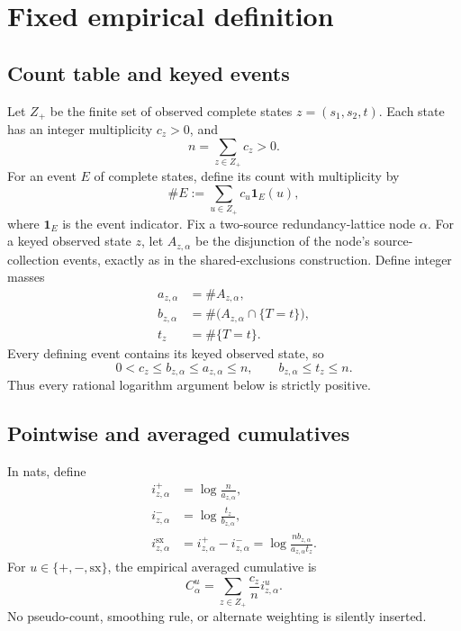 \documentclass[11pt]{article}
\theoremstyle{definition}
\newcommand{\sx}{\mathrm{sx}}
\begin{document}
\section{Fixed empirical definition}

\subsection{Count table and keyed events}

Let \(Z_+\) be the finite set of observed complete states \(z=(s_1,s_2,t)\).  Each state has an
integer multiplicity \(c_z>0\), and
\begin{equation}\label{eq:n}
n=\sum_{z\in Z_+}c_z>0.
\end{equation}
For an event \(E\) of complete states, define its count with multiplicity by
\[
  \#E:=\sum_{u\in Z_+}c_u\mathbf{1}_E(u),
\]
where \(\mathbf{1}_E\) is the event indicator.
Fix a two-source redundancy-lattice node \(\alpha\).  For a keyed observed state \(z\), let
\(A_{z,\alpha}\) be the disjunction of the node's source-collection events, exactly as in the
shared-exclusions construction.  Define integer masses
\begin{align}
a_{z,\alpha}&=\#A_{z,\alpha},\\
b_{z,\alpha}&=\#\bigl(A_{z,\alpha}\cap\{T=t\}\bigr),\\
t_z&=\#\{T=t\}.
\end{align}
Every defining event contains its keyed observed state, so
\begin{equation}\label{eq:nesting}
0<c_z\le b_{z,\alpha}\le a_{z,\alpha}\le n,
\qquad b_{z,\alpha}\le t_z\le n.
\end{equation}
Thus every rational logarithm argument below is strictly positive.

\subsection{Pointwise and averaged cumulatives}

In nats, define
\begin{align}
i^+_{z,\alpha}&=\log\frac{n}{a_{z,\alpha}},\label{eq:iplus}\\
i^-_{z,\alpha}&=\log\frac{t_z}{b_{z,\alpha}},\label{eq:iminus}\\
i^{\sx}_{z,\alpha}
 &=i^+_{z,\alpha}-i^-_{z,\alpha}
 =\log\frac{n b_{z,\alpha}}{a_{z,\alpha}t_z}.\label{eq:inet}
\end{align}
For \(u\in\{+,-,\sx\}\), the empirical averaged cumulative is
\begin{equation}\label{eq:cumulative}
C^u_\alpha=\sum_{z\in Z_+}\frac{c_z}{n}i^u_{z,\alpha}.
\end{equation}
No pseudo-count, smoothing rule, or alternate weighting is silently inserted.
\end{document}
